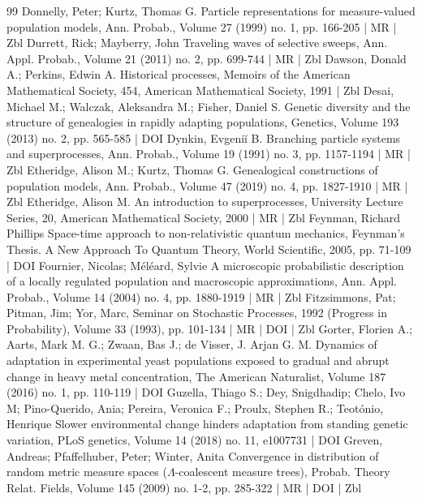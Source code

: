 \documentclass[10pt]{amsart}
\theoremstyle{definition}\newtheorem{defi}[theo]{Definition}\newtheorem{rema}[theo]{Remark}\newtheorem{exam}[theo]{Example}\newtheorem{exem}[theo]{Example}\newtheorem{nota}[theo]{Notation}
\begin{document}
\begin{thebibliography}{99}
Donnelly, Peter; Kurtz, Thomas G. Particle representations for measure-valued population models, Ann. Probab., Volume 27 (1999) no. 1, pp. 166-205 | MR | Zbl
Durrett, Rick; Mayberry, John Traveling waves of selective sweeps, Ann. Appl. Probab., Volume 21 (2011) no. 2, pp. 699-744 | MR | Zbl
Dawson, Donald A.; Perkins, Edwin A. Historical processes, Memoirs of the American Mathematical Society, 454, American Mathematical Society, 1991 | Zbl
Desai, Michael M.; Walczak, Aleksandra M.; Fisher, Daniel S. Genetic diversity and the structure of genealogies in rapidly adapting populations, Genetics, Volume 193 (2013) no. 2, pp. 565-585 | DOI
Dynkin, Evgeniĭ B. Branching particle systems and superprocesses, Ann. Probab., Volume 19 (1991) no. 3, pp. 1157-1194 | MR | Zbl
Etheridge, Alison M.; Kurtz, Thomas G. Genealogical constructions of population models, Ann. Probab., Volume 47 (2019) no. 4, pp. 1827-1910 | MR | Zbl
Etheridge, Alison M. An introduction to superprocesses, University Lecture Series, 20, American Mathematical Society, 2000 | MR | Zbl
Feynman, Richard Phillips Space-time approach to non-relativistic quantum mechanics, Feynman’s Thesis. A New Approach To Quantum Theory, World Scientific, 2005, pp. 71-109 | DOI
Fournier, Nicolas; Méléard, Sylvie A microscopic probabilistic description of a locally regulated population and macroscopic approximations, Ann. Appl. Probab., Volume 14 (2004) no. 4, pp. 1880-1919 | MR | Zbl
Fitzsimmons, Pat; Pitman, Jim; Yor, Marc, Seminar on Stochastic Processes, 1992 (Progress in Probability), Volume 33 (1993), pp. 101-134 | MR | DOI | Zbl
Gorter, Florien A.; Aarts, Mark M. G.; Zwaan, Bas J.; de Visser, J. Arjan G. M. Dynamics of adaptation in experimental yeast populations exposed to gradual and abrupt change in heavy metal concentration, The American Naturalist, Volume 187 (2016) no. 1, pp. 110-119 | DOI
Guzella, Thiago S.; Dey, Snigdhadip; Chelo, Ivo M; Pino-Querido, Ania; Pereira, Veronica F.; Proulx, Stephen R.; Teotónio, Henrique Slower environmental change hinders adaptation from standing genetic variation, PLoS genetics, Volume 14 (2018) no. 11, e1007731 | DOI
Greven, Andreas; Pfaffelhuber, Peter; Winter, Anita Convergence in distribution of random metric measure spaces ($\Lambda $-coalescent measure trees), Probab. Theory Relat. Fields, Volume 145 (2009) no. 1-2, pp. 285-322 | MR | DOI | Zbl

\end{thebibliography}
\end{document}
